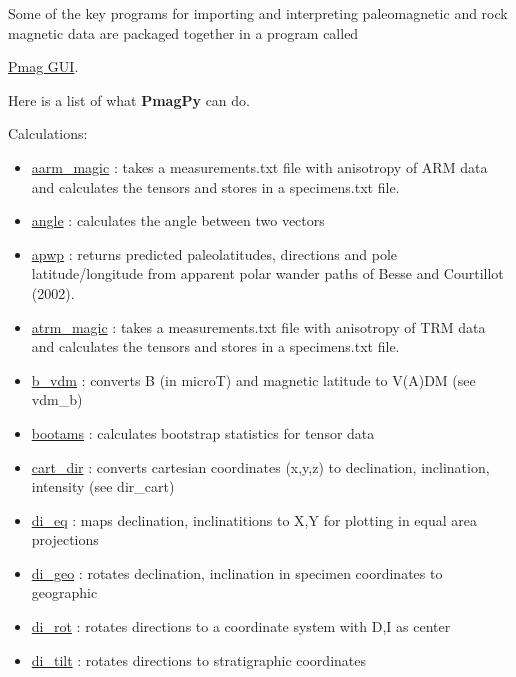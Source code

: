 \documentclass[11pt]{book}
\begin{document}
{Some of the key programs for importing and interpreting paleomagnetic and rock magnetic data are packaged together in a program called {\href{#pmag_gui.py}{Pmag GUI}.

Here is a list of what {\bf PmagPy} can do.

Calculations:

\begin{itemize}

\item \href{http://pmagpy.github.io/PmagPy.html#aarm_magic}{aarm\_magic} : takes a measurements.txt file with anisotropy of ARM data and calculates the tensors and stores in a specimens.txt file.
\item \href{http://pmagpy.github.io/PmagPy.html#angle}{angle} : calculates the angle between two vectors
\item \href{http://pmagpy.github.io/PmagPy.html#apwp}{apwp} : returns predicted paleolatitudes, directions and pole latitude/longitude from apparent polar wander paths of Besse and Courtillot (2002).
\item \href{http://pmagpy.github.io/PmagPy.html#atrm_magic}{atrm\_magic} : takes a measurements.txt file with anisotropy of TRM data and calculates the tensors and stores in a specimens.txt file.
\item \href{http://pmagpy.github.io/PmagPy.html#b_vdm}{b\_vdm} : converts B (in microT) and magnetic latitude to V(A)DM (see vdm\_b)
\item \href{http://pmagpy.github.io/PmagPy.html#bootams}{bootams} : calculates bootstrap statistics for tensor data
\item \href{http://pmagpy.github.io/PmagPy.html#cart_dir}{cart\_dir} : converts cartesian coordinates (x,y,z) to declination, inclination, intensity (see dir\_cart)
\item \href{http://pmagpy.github.io/PmagPy.html#di_eq}{di\_eq} : maps declination, inclinatitions to X,Y for plotting in equal area projections
\item \href{http://pmagpy.github.io/PmagPy.html#di_geo}{di\_geo} : rotates declination, inclination in specimen coordinates to geographic
\item \href{http://pmagpy.github.io/PmagPy.html#di_rot}{di\_rot} : rotates directions to a  coordinate system with D,I as center
\item \href{http://pmagpy.github.io/PmagPy.html#di_tilt}{di\_tilt} : rotates directions to stratigraphic coordinates

\end{itemize}}}
\end{document}
